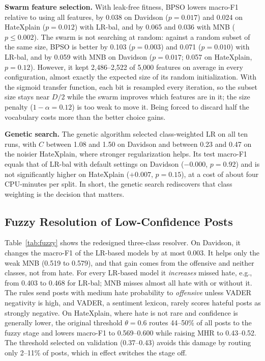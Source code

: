 \documentclass[lettersize,journal]{IEEEtran}
\begin{document}
\textbf{Swarm feature selection.} With leak-free fitness, BPSO lowers macro-F1 relative to using all features, by 0.038 on Davidson ($p=0.017$) and 0.024 on HateXplain ($p=0.012$) with LR-bal, and by 0.065 and 0.036 with MNB ($p\le0.002$). The swarm is not searching at random: against a random subset of the same size, BPSO is better by 0.103 ($p=0.003$) and 0.071 ($p=0.010$) with LR-bal, and by 0.059 with MNB on Davidson ($p=0.017$; 0.057 on HateXplain, $p=0.12$). However, it kept 2,486--2,522 of 5,000 features on average in every configuration, almost exactly the expected size of its random initialization. With the sigmoid transfer function, each bit is resampled every iteration, so the subset size stays near $D/2$ while the swarm improves which features are in it; the size penalty ($1-\alpha=0.12$) is too weak to move it. Being forced to discard half the vocabulary costs more than the better choice gains.

\textbf{Genetic search.} The genetic algorithm selected class-weighted LR on all ten runs, with $C$ between 1.08 and 1.50 on Davidson and between 0.23 and 0.47 on the noisier HateXplain, where stronger regularization helps. Its test macro-F1 equals that of LR-bal with default settings on Davidson ($-0.000$, $p=0.92$) and is not significantly higher on HateXplain ($+0.007$, $p=0.15$), at a cost of about four CPU-minutes per split. In short, the genetic search rediscovers that class weighting is the decision that matters.

\subsection{Fuzzy Resolution of Low-Confidence Posts}\label{sec:fuzzyres}
\begin{table}[t]
\centering
\caption{Three-Class Fuzzy Resolver (Mean Over Splits). For Each Base Model, the First Row Uses the Original $\theta=0.6$ and the Second the $\theta$ Selected on Validation. Hate Routed: Share of All Hate Posts Sent to the Fuzzy Stage. Arrows: Base Model $\to$ Base + Fuzzy.}
\label{tab:fuzzy}
\scriptsize
\setlength{\tabcolsep}{3pt}

\end{table}

Table~\ref{tab:fuzzy} shows the redesigned three-class resolver. On Davidson, it changes the macro-F1 of the LR-based models by at most 0.003. It helps only the weak MNB (0.519 to 0.579), and that gain comes from the offensive and neither classes, not from hate. For every LR-based model it \emph{increases} missed hate, e.g., from 0.403 to 0.468 for LR-bal; MNB misses almost all hate with or without it. The rules send posts with medium hate probability to \emph{offensive} unless VADER negativity is high, and VADER, a sentiment lexicon, rarely scores hateful posts as strongly negative. On HateXplain, where hate is not rare and confidence is generally lower, the original threshold $\theta=0.6$ routes 44--50\% of all posts to the fuzzy stage and lowers macro-F1 to 0.569--0.600 while raising MHR to 0.43--0.52. The threshold selected on validation (0.37--0.43) avoids this damage by routing only 2--11\% of posts, which in effect switches the stage off.
\end{document}
